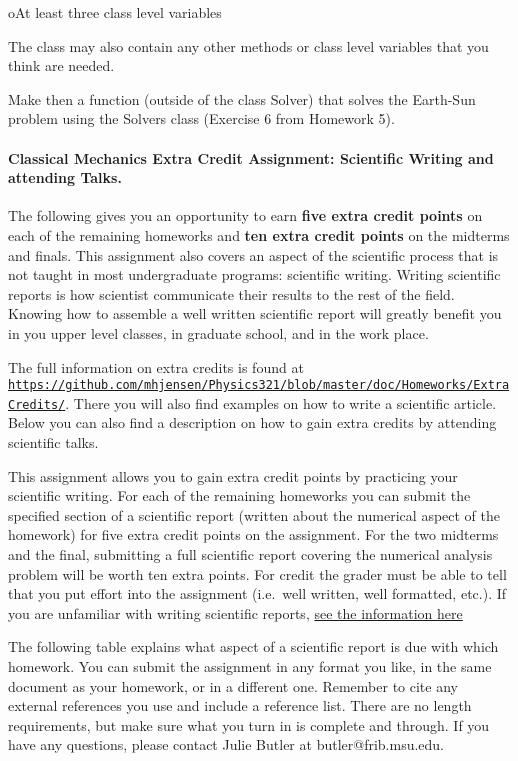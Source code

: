 \documentclass[%
oneside,                 %
final,                   %
10pt]{article}
\begin{document}
\noindent
oAt least three class level variables

The class may also contain any other methods or class level variables that you think are needed.

Make then a function (outside of the class Solver) that solves the Earth-Sun problem using the Solvers class (Exercise 6 from Homework 5).



\paragraph{Classical Mechanics Extra Credit Assignment: Scientific Writing and attending Talks.}
The following gives you an opportunity to earn \textbf{five extra credit
points} on each of the remaining homeworks and \textbf{ten extra credit points}
on the midterms and finals.  This assignment also covers an aspect of
the scientific process that is not taught in most undergraduate
programs: scientific writing.  Writing scientific reports is how
scientist communicate their results to the rest of the field.  Knowing
how to assemble a well written scientific report will greatly benefit
you in you upper level classes, in graduate school, and in the work
place.

The full information on extra credits is found at \href{{https://github.com/mhjensen/Physics321/blob/master/doc/Homeworks/ExtraCredits/}}{\nolinkurl{https://github.com/mhjensen/Physics321/blob/master/doc/Homeworks/ExtraCredits/}}. There you will also find examples on how to write a scientific article. 
Below you can also find a description on how to gain extra credits by attending scientific talks.


This assignment allows you to gain extra credit points by practicing
your scientific writing.  For each of the remaining homeworks you can
submit the specified section of a scientific report (written about the
numerical aspect of the homework) for five extra credit points on the
assignment.  For the two midterms and the final, submitting a full
scientific report covering the numerical analysis problem will be
worth ten extra points.  For credit the grader must be able to tell
that you put effort into the assignment (i.e.~well written, well
formatted, etc.).  If you are unfamiliar with writing scientific
reports, \href{{https://github.com/mhjensen/Physics321/blob/master/doc/Homeworks/ExtraCredits/IntroductionScientificWriting.md}}{see the information here}

The following table explains what aspect of a scientific report is due
with which homework.  You can submit the assignment in any format you
like, in the same document as your homework, or in a different one.
Remember to cite any external references you use and include a
reference list.  There are no length requirements, but make sure what
you turn in is complete and through.  If you have any questions,
please contact Julie Butler at butler@frib.msu.edu.
\end{document}

